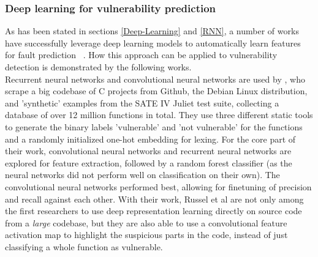 \documentclass[
	a4paper,
	pagesize,
	pdftex,
	12pt,
	twoside, %
	BCOR=5mm, %
	ngerman,
	fleqn,
	final,
	]{scrartcl}
\begin{document}
\subsubsection{Deep learning for vulnerability prediction}\label{deep-vulnerability-prediction}
As has been stated in sections \ref{Deep-Learning} and \ref{RNN}, a number of works have successfully leverage deep learning models to automatically learn features for fault prediction ~\cite{IEEE.2015b,IEEE.2016,Wang.2016}. How this approach can be applied to vulnerability detection is demonstrated by the following works.\\
Recurrent neural networks and convolutional neural networks are used by \cite{Russell.2018}, who scrape a big codebase of C projects from Github, the Debian Linux distribution, and 'synthetic' examples from the SATE IV Juliet test suite, collecting a database of over 12 million functions in total. They use three different static tools to generate the binary labels 'vulnerable' and 'not vulnerable' for the functions and a randomly initialized one-hot embedding for lexing. For the core part of their work, convolutional neural networks and recurrent neural networks are explored for feature extraction, followed by a random forest classifier (as the neural networks did not perform well on classification on their own). The convolutional neural networks performed best, allowing for finetuning of precision and recall against each other. With their work, Russel et al are not only among the first researchers to use deep representation learning directly on source code from a \textit{large} codebase, but they are also able to use a convolutional feature activation map to highlight the suspicious parts in the code, instead of just classifying a whole function as vulnerable.\\
\end{document}
